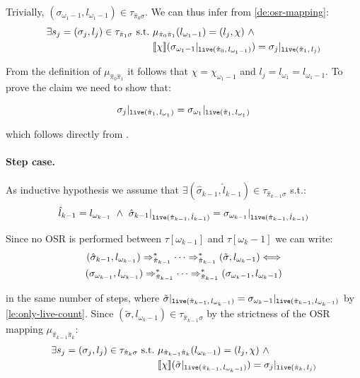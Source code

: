 \begin{myproof}
\noindent Trivially, $(\sigma_{\omega_1-1},l_{\omega_1-1})\in\tau_{\hat{\pi}_0\sigma}$. We can thus infer from \ref{de:osr-mapping}:
\begin{align*}
\exists s_j=(\sigma_j,l_j)\in\tau_{\hat{\pi}_1\sigma}~\text{s.t.}~&\mu_{\hat{\pi}_{0}\hat{\pi}_1}(l_{\omega_1-1})=(l_j,\chi)~\wedge \\
&[\![\chi]\!](\sigma_{\omega_1-1}\vert_{\text{${\tt live}$}(\hat{\pi}_{0},\,l_{\omega_1-1})})=\sigma_j\vert_{\text{${\tt live}$}(\hat{\pi}_{1},\,l_j)}
\end{align*}

\noindent From the definition of $\mu_{\hat{\pi}_{0}\hat{\pi}_1}$ it follows that $\chi=\chi_{\omega_1-1}$ and $l_j=l_{\omega_1}=l_{\omega_1-1}$. To prove the claim we need to show that:

\begin{equation*}
\sigma_j\vert_{\text{${\tt live}$}(\hat{\pi}_{1},\,l_{\omega_1})}=\sigma_{\omega_1}\vert_{\text{${\tt live}$}(\hat{\pi}_{1},\,l_{\omega_1})}
\end{equation*}

\noindent which follows directly from .

\paragraph*{Step case.} As inductive hypothesis we assume that $\exists (\hat{\sigma}_{k-1},\hat{l}_{k-1})\in\tau_{\hat{\pi}_{k-1}\sigma}$ s.t.:
\begin{equation*}
\hat{l}_{k-1}=l_{\omega_{k-1}} ~\wedge~ \hat{\sigma}_{k-1}\vert_{\text{${\tt live}$}(\hat{\pi}_{k-1},\,\hat{l}_{k-1})}=\sigma_{\omega_{k-1}}\vert_{\text{${\tt live}$}(\hat{\pi}_{k-1},\,\hat{l}_{k-1})}
\end{equation*}

\noindent
Since no OSR is performed between $\tau[\omega_{k-1}]$ and $\tau[\omega_k-1]$ we can write:
\begin{gather*}
(\hat{\sigma}_{k-1}, l_{\omega_{k-1}}) \Rightarrow^*_{\hat{\pi}_{k-1}} \cdots \Rightarrow^*_{\hat{\pi}_{k-1}} (\tilde{\sigma},l_{\omega_k-1}) \Longleftrightarrow \\
(\sigma_{\omega_{k-1}}, l_{\omega_{k-1}}) \Rightarrow^*_{\hat{\pi}_{k-1}} \cdots \Rightarrow^*_{\hat{\pi}_{k-1}} (\sigma_{\omega_k-1},l_{\omega_k-1})
\end{gather*}

\noindent in the same number of steps, where $\tilde{\sigma}\vert_{\text{${\tt live}$}(\hat{\pi}_{k-1},\,l_{\omega_k-1})} = \sigma_{\omega_k-1}\vert_{\text{${\tt live}$}(\hat{\pi}_{k-1},\,l_{\omega_k-1})}$ by \ref{le:only-live-count}. Since $(\tilde{\sigma},l_{\omega_k-1})\in\tau_{\hat{\pi}_{k-1}\sigma}$ by the strictness of the OSR mapping $\mu_{\hat{\pi}_{k-1}\hat{\pi}_{k}}$:
\begin{align*}
\exists s_j=(\sigma_j,l_j)\in\tau_{\hat{\pi}_k\sigma}~\text{s.t.}~&\mu_{\hat{\pi}_{k-1}\hat{\pi}_{k}}(l_{\omega_k-1})=(l_j,\chi)~\wedge \\
&[\![\chi]\!](\tilde{\sigma}\vert_{\text{${\tt live}$}(\hat{\pi}_{k-1},\,l_{\omega_k-1})})=\sigma_j\vert_{\text{${\tt live}$}(\hat{\pi}_{k},\,l_j)}
\end{align*}


\end{myproof}
